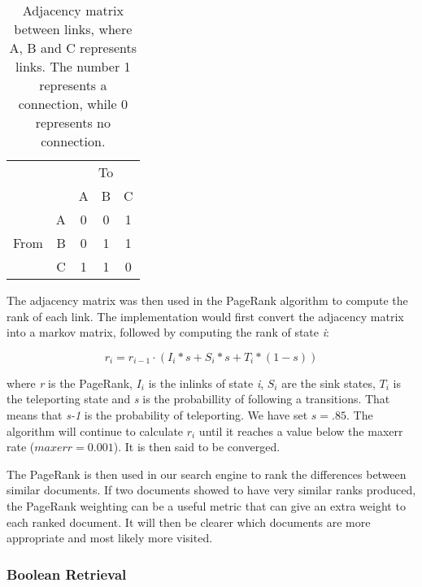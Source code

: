 \begin{table}[!h]
  \centering
  \begin{tabular}{|lr|c|c|c|} \cline{3-5}
  \multicolumn{1}{l}{} && \multicolumn{3}{c|}{To} \\ \cline{3-5}
  \multicolumn{1}{l}{} & & A & B & C  \\ \hline
  \multirow{3}{*}{\begin{sideways}From\end{sideways}}
  & \multicolumn{1}{|r|}{A} & 0 & 0 & 1  \\ \cline{2-5}
  & \multicolumn{1}{|r|}{B} & 0 & 1 & 1  \\ \cline{2-5}
  & \multicolumn{1}{|r|}{C} & 1 & 1 & 0  \\ \hline
  \end{tabular}
  \caption{Adjacency matrix between links, where A, B and C represents links. The number 1 represents a connection, while 0 represents no connection.}
  \label{fig:adj_mx}
\end{table}

The adjacency matrix was then used in the PageRank algorithm to compute the rank of each link. The implementation would first convert the adjacency matrix into a markov matrix, followed by computing the rank of state \emph{i}:

$$ r_i = r_{i-1} \cdot (I_i *s + S_i * s + T_i * (1-s)) $$ 

where \emph{r} is the PageRank, \emph{$I_i$} is the inlinks of state \emph{i}, \emph{$S_i$} are the sink states, \emph{$T_i$} is the teleporting state and \emph{s} is the probabillity of following a transitions. That means that \emph{s-1} is the probability of teleporting. We have set $s=.85$. The algorithm will continue to calculate \emph{$r_i$} until it reaches a value below the maxerr rate ($maxerr = 0.001$). It is then said to be converged. 

The PageRank is then used in our search engine to rank the differences between similar documents. If two documents showed to have very similar ranks produced, the PageRank weighting can be a useful metric that can give an extra weight to each ranked document. It will then be clearer which documents are more appropriate and most likely more visited. 



\subsubsection{Boolean Retrieval} %
\label{ssub:boolean_retrieval}


